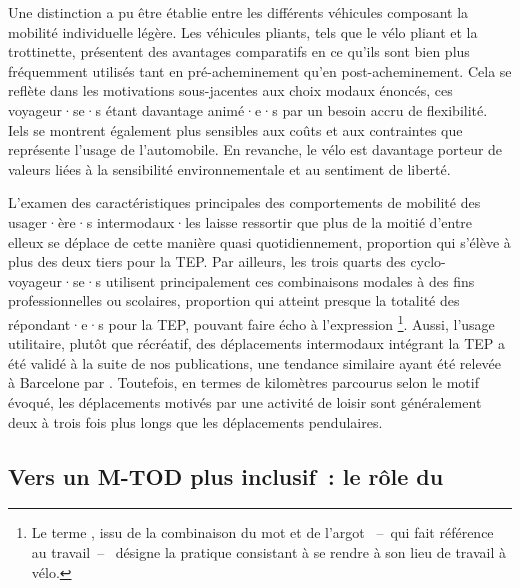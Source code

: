 \begin{refsegment}
Une distinction a pu être établie entre les différents véhicules composant la mobilité individuelle légère. Les véhicules pliants, tels que le vélo pliant et la trottinette, présentent des avantages comparatifs en ce qu'ils sont bien plus fréquemment utilisés tant en pré-acheminement qu'en post-acheminement. Cela se reflète dans les motivations sous-jacentes aux choix modaux énoncés, ces voyageur·se·s étant davantage animé·e·s par un besoin accru de flexibilité. Iels se montrent également plus sensibles aux coûts et aux contraintes que représente l'usage de l'automobile. En revanche, le vélo est davantage porteur de valeurs liées à la sensibilité environnementale et au sentiment de liberté.%

L'examen des caractéristiques principales des comportements de mobilité des usager·ère·s intermodaux·les laisse ressortir que plus de la moitié d'entre elleux se déplace de cette manière quasi quotidiennement, proportion qui s'élève à plus des deux tiers pour la \acrshort{TEP}. Par ailleurs, les trois quarts des cyclo-voyageur·se·s utilisent principalement ces combinaisons modales à des fins professionnelles ou scolaires, proportion qui atteint presque la totalité des répondant·e·s pour la \acrshort{TEP}, pouvant faire écho à l'expression \footnote{
   Le terme , issu de la combinaison du mot  et de l'argot ~–~qui fait référence au travail~–~ désigne la pratique consistant à se rendre à son lieu de travail à vélo.
}. Aussi, l'usage utilitaire, plutôt que récréatif, des déplacements intermodaux intégrant la \acrshort{TEP} a été validé à la suite de nos publications, une tendance similaire ayant été relevée à Barcelone par \textcolor{blue}{\textcite[9]{roig-costa_disrupted_2024}}. Toutefois, en termes de kilomètres parcourus selon le motif évoqué, les déplacements motivés par une activité de loisir sont généralement deux à trois fois plus longs que les déplacements pendulaires.%

\subsection*{Vers un M-TOD plus inclusif~: le rôle du 
    \label{chap4:principaux-enseignements-2}
    }


\end{refsegment}

